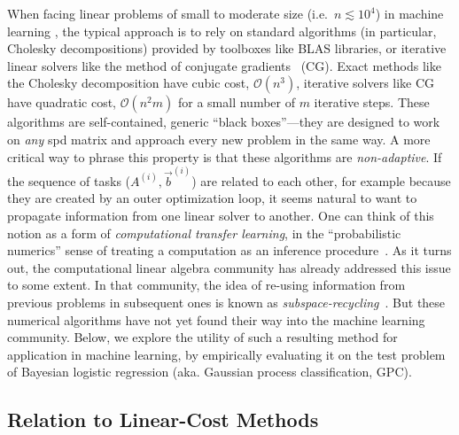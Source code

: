 \documentclass{article}
\begin{document}
When facing linear problems of small to moderate size (i.e.~$n\lesssim 10^4$) in machine learning , the typical approach is to rely on standard algorithms (in particular, Cholesky decompositions) provided by toolboxes like BLAS libraries, or iterative linear solvers like the method of conjugate gradients~\cite{hestenes52} (CG). Exact methods like the Cholesky decomposition have cubic cost, $\mathcal{O}(n^3)$, iterative solvers like CG have quadratic cost, $\mathcal{O}(n^2m)$ for a small number of $m$ iterative steps. These algorithms are self-contained, generic ``black boxes''---they are designed to work on \emph{any} spd matrix and approach every new problem in the same way. A more critical way to phrase this property is that these algorithms are \emph{non-adaptive}. If the sequence of tasks ($A^{(i)},\vec{b}^{(i)}$) are related to each other, for example because they are created by an outer optimization loop, it seems natural to want to propagate information from one linear solver to another. One can think of this notion as a form of \emph{computational transfer learning}, in the ``probabilistic numerics'' sense of treating a computation as an inference procedure~\cite{hennig2015probabilistic}. As it turns out, the computational linear algebra community has already addressed this issue to some extent. In that community, the idea of re-using information from previous problems in subsequent ones is known as \emph{subspace-recycling}~\cite{parks06}. But these numerical algorithms have not yet found their way into the machine learning community. Below, we explore the utility of such a resulting method for application in machine learning, by empirically evaluating it on the test problem of Bayesian logistic regression (aka. Gaussian process classification, GPC).

\subsection{Relation to Linear-Cost Methods}
\label{sub:relation_to_linear_cost_methods}
\end{document}
